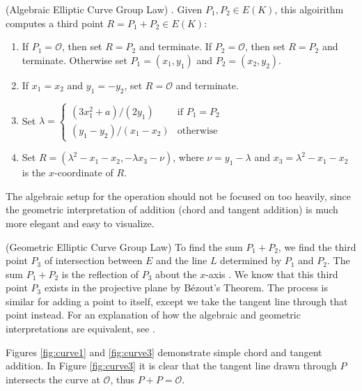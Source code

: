 \documentclass[]{math_paper}
\begin{document}
\begin{algorithma} \label{grouplaw} (Algebraic Elliptic Curve Group Law) \cite{stein2008elementary}. Given $P_1, P_2 \in E(K)$, this algoirithm computes a third point $R = P_1 + P_2 \in E(K)$:
    \begin{enumerate}
        \item If $P_1 = \mathcal{O}$, then set $R = P_2$ and terminate. If $P_2 = \mathcal{O}$, then set $R = P_2$ and terminate. Otherwise set $P_1 = (x_1, y_1)$ and $P_2 = (x_2, y_2)$.
        \item If $x_1 = x_2$ and $y_1 = -y_2$, set $R = \mathcal{O}$ and terminate.
        \item Set $\lambda = \begin{cases} (3x_1^2 + a) / (2y_1) & \text{if $P_1 = P_2$} \\ (y_1 - y_2)/(x_1 - x_2) & \text{otherwise} \end{cases}$
        \item Set $R = (\lambda^2 - x_1 - x_2, -\lambda x_3 - \nu)$, where $\nu = y_1 - \lambda$ and $x_3 = \lambda^2 - x_1 - x_2$ is the $x$-coordinate of $R$.
    \end{enumerate}
\end{algorithma}

The algebraic setup for the operation should not be focused on too heavily, since the geometric interpretation of addition (chord and tangent addition) is much more elegant and easy to visualize.
\begin{algorithma} \label{geometric} (Geometric Elliptic Curve Group Law)
    To find the sum $P_1 + P_2$, we find the third point $P_3$ of intersection between $E$ and the line $L$ determined by $P_1$ and $P_2$. The sum $P_1 + P_2$ is the reflection of $P_3$ about the $x$-axis \cite{stein2008elementary}. We know that this third point $P_3$ exists in the projective plane by Bézout's Theorem. The process is similar for adding a point to itself, except we take the tangent line through that point instead. For an explanation of how the algebraic and geometric interpretations are equivalent, see \cite{Kline}.
\end{algorithma}

Figures \ref{fig:curve1} and \ref{fig:curve3} demonstrate simple chord and tangent addition. In Figure \ref{fig:curve3} it is clear that the tangent line drawn through $P$ intersects the curve at $\mathcal{O}$, thus $P + P = \mathcal{O}$.
\end{document}
